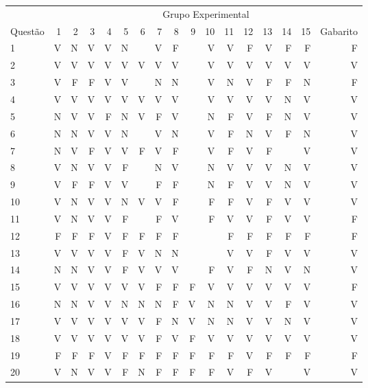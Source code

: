 \begin{apendicesenv}
\begin{center}
	\begin{tabular}{ l r r r r r r r r r r r r r r r r}
	\hline
	& \multicolumn{16}{c}{Grupo Experimental}\\
	\cline{2 - 16} %
	\multirow[c]{-2}{*}{Questão} & 1 & 2 & 3 & 4 & 5 & 6 & 7 & 8 & 9 & 10 & 11 & 12 & 13 & 14 & 15 & Gabarito\\
	\hline
	1	&	V	&	N	&	V	&	V	&	N	&		&	V	&	F	&		&	V	&	V	&	F	&	V	&	F	&	F	&	F	\\
	2	&	V	&	V	&	V	&	V	&	V	&	V	&	V	&	V	&		&	V	&	V	&	V	&	V	&	V	&	V	&	V	\\
	3	&	V	&	F	&	F	&	V	&	V	&		&	N	&	N	&		&	V	&	N	&	V	&	F	&	F	&	N	&	F	\\
	4	&	V	&	V	&	V	&	V	&	V	&	V	&	V	&	V	&		&	V	&	V	&	V	&	V	&	N	&	V	&	V	\\
	5	&	N	&	V	&	V	&	F	&	N	&	V	&	F	&	V	&		&	N	&	F	&	V	&	F	&	N	&	V	&	V	\\
	6	&	N	&	N	&	V	&	V	&	N	&		&	V	&	N	&		&	V	&	F	&	N	&	V	&	F	&	N	&	V	\\
	7	&	N	&	V	&	F	&	V	&	V	&	F	&	V	&	F	&		&	V	&	F	&	V	&	F	&		&	V	&	V	\\
	8	&	V	&	N	&	V	&	V	&	F	&		&	N	&	V	&		&	N	&	V	&	V	&	V	&	N	&	V	&	V	\\
	9	&	V	&	F	&	F	&	V	&	V	&		&	F	&	F	&		&	N	&	F	&	V	&	V	&	N	&	V	&	V	\\
	10	&	V	&	N	&	V	&	V	&	N	&	V	&	V	&	F	&		&	F	&	F	&	V	&	F	&	V	&	V	&	V	\\
	11	&	V	&	N	&	V	&	V	&	F	&		&	F	&	V	&		&	F	&	V	&	V	&	F	&	V	&	V	&	F	\\
	12	&	F	&	F	&	F	&	V	&	F	&	F	&	F	&	F	&		&		&	F	&	F	&	F	&	F	&	F	&	F	\\
	13	&	V	&	V	&	V	&	V	&	F	&	V	&	N	&	N	&		&		&	V	&	V	&	F	&	V	&	V	&	V	\\
	14	&	N	&	N	&	V	&	V	&	F	&	V	&	V	&	V	&		&	F	&	V	&	F	&	N	&	V	&	N	&	V	\\
	15	&	V	&	V	&	V	&	V	&	V	&	V	&	F	&	F	&	F	&	V	&	V	&	V	&	V	&	V	&	V	&	F	\\
	16	&	N	&	N	&	V	&	V	&	N	&	N	&	N	&	F	&	V	&	N	&	N	&	V	&	V	&	F	&	V	&	V	\\
	17	&	V	&	V	&	V	&	V	&	V	&	V	&	F	&	N	&	V	&	N	&	N	&	V	&	V	&	N	&	V	&	V	\\
	18	&	V	&	V	&	V	&	V	&	V	&	V	&	F	&	V	&	F	&	V	&	V	&	V	&	V	&	V	&	V	&	V	\\
	19	&	F	&	F	&	F	&	V	&	F	&	F	&	F	&	F	&	F	&	F	&	F	&	V	&	F	&	F	&	F	&	F	\\
	20	&	V	&	N	&	V	&	V	&	F	&	N	&	F	&	F	&	F	&	F	&	V	&	F	&	V	&		&	V	&	V	\\

\end{tabular}
\end{center}
\end{apendicesenv}
